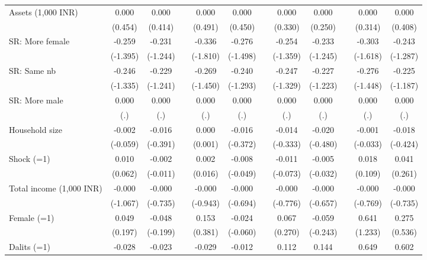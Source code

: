 {\begin{longtable}{@{\extracolsep{\fill}}lccccccccccc}
    Assets (1,000 INR) & 0.000 & 0.000 &       & 0.000 & 0.000 &       & 0.000 & 0.000 &       & 0.000 & 0.000 \\
          & (0.454) & (0.414) &       & (0.491) & (0.450) &       & (0.330) & (0.250) &       & (0.314) & (0.408) \\
    SR: More female & -0.259 & -0.231 &       & -0.336 & -0.276 &       & -0.254 & -0.233 &       & -0.303 & -0.243 \\
          & (-1.395) & (-1.244) &       & (-1.810) & (-1.498) &       & (-1.359) & (-1.245) &       & (-1.618) & (-1.287) \\
    SR: Same nb & -0.246 & -0.229 &       & -0.269 & -0.240 &       & -0.247 & -0.227 &       & -0.276 & -0.225 \\
          & (-1.335) & (-1.241) &       & (-1.450) & (-1.293) &       & (-1.329) & (-1.223) &       & (-1.448) & (-1.187) \\
    SR: More male & 0.000 & 0.000 &       & 0.000 & 0.000 &       & 0.000 & 0.000 &       & 0.000 & 0.000 \\
          & (.)   & (.)   &       & (.)   & (.)   &       & (.)   & (.)   &       & (.)   & (.) \\
    Household size & -0.002 & -0.016 &       & 0.000 & -0.016 &       & -0.014 & -0.020 &       & -0.001 & -0.018 \\
          & (-0.059) & (-0.391) &       & (0.001) & (-0.372) &       & (-0.333) & (-0.480) &       & (-0.033) & (-0.424) \\
    Shock (=1) & 0.010 & -0.002 &       & 0.002 & -0.008 &       & -0.011 & -0.005 &       & 0.018 & 0.041 \\
          & (0.062) & (-0.011) &       & (0.016) & (-0.049) &       & (-0.073) & (-0.032) &       & (0.109) & (0.261) \\
    Total income (1,000 INR) & -0.000 & -0.000 &       & -0.000 & -0.000 &       & -0.000 & -0.000 &       & -0.000 & -0.000 \\
          & (-1.067) & (-0.735) &       & (-0.943) & (-0.694) &       & (-0.776) & (-0.657) &       & (-0.769) & (-0.735) \\
    Female (=1) & 0.049 & -0.048 &       & 0.153 & -0.024 &       & 0.067 & -0.059 &       & 0.641 & 0.275 \\
          & (0.197) & (-0.199) &       & (0.381) & (-0.060) &       & (0.270) & (-0.243) &       & (1.233) & (0.536) \\
    Dalits (=1) & -0.028 & -0.023 &       & -0.029 & -0.012 &       & 0.112 & 0.144 &       & 0.649 & 0.602 \\

\end{longtable}}
